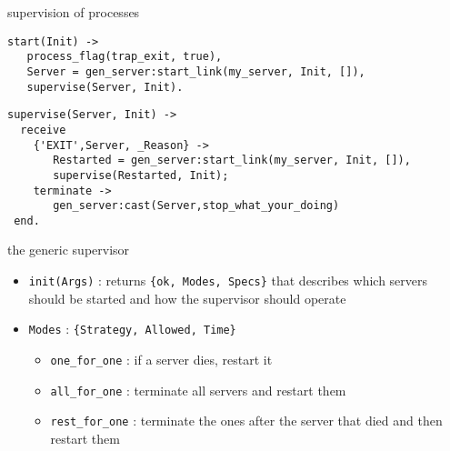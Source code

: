 \begin {frame}[fragile]{supervision of processes}

\begin{verbatim}
start(Init) ->
   process_flag(trap_exit, true),
   Server = gen_server:start_link(my_server, Init, []),
   supervise(Server, Init).
\end{verbatim}

\pause\vspace{20pt}
\begin{verbatim}
supervise(Server, Init) ->
  receive
    {'EXIT',Server, _Reason} ->
       Restarted = gen_server:start_link(my_server, Init, []),
       supervise(Restarted, Init);
    terminate ->
       gen_server:cast(Server,stop_what_your_doing)
 end.
\end{verbatim}

\end{frame}

\begin{frame}{the generic supervisor}

\begin{itemize}
\item {\tt init(Args)} : returns {\tt \{ok, Modes, Specs\}} that describes which servers should be started and how the supervisor should operate
\end{itemize}

\pause\vspace{20pt}

\begin{itemize}
 \item {\tt Modes} : {\tt \{Strategy, Allowed, Time\}}
 \pause
 \begin{itemize}
  \item {\tt one\_for\_one} : if a server dies, restart it
  \pause
  \item {\tt all\_for\_one} : terminate all servers and restart them 
  \pause
  \item {\tt rest\_for\_one} : terminate the ones after the server that died and then restart them
  \pause
 \end{itemize}
\end{itemize}

\end{frame}

